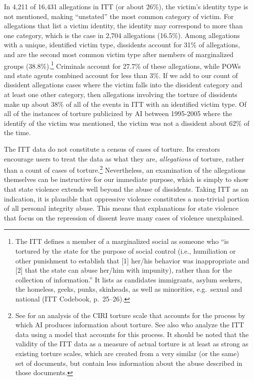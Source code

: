 \documentclass[12pt]{article}
\begin{document}
In 4,211 of 16,431 allegations in ITT (or about 26\%), the victim's identity type is not mentioned, making ``unstated'' the most common category of victim. For allegations that list a victim identity, the identity may correspond to more than one category, which is the case in 2,704 allegations (16.5\%). Among allegations with a unique, identified victim type, dissidents account for 31\% of allegations, and are the second most common victim type after members of marginalized groups (38.8\%).\footnote{The ITT defines a member of a marginalized social as someone who ``is tortured by the state for the purpose of social control (i.e., humiliation or other punishment to establish that [1] her/his behavior was inappropriate and [2] that the state can abuse her/him with impunity), rather than for the collection of information.'' It lists as candidates immigrants, asylum seekers, the homeless, geeks, punks, skinheads, as well as minorities, e.g.\ sexual and national (ITT Codebook, p.\ 25--26).} Criminals account for 27.7\% of these allegations, while POWs and state agents combined account for less than 3\%. If we add to our count of dissident allegations cases where the victim falls into the dissident category and at least one other category, then allegations involving the torture of dissidents make up about 38\% of all of the events in ITT with an identified victim type. Of all of the instances of torture publicized by AI between 1995-2005 where the identify of the victim was mentioned, the victim was not a dissident about 62\% of the time. 

The ITT data do not constitute a census of cases of torture. Its creators encourage users to treat the data as what they are, {\em allegations} of torture, rather than a count of cases of torture.\footnote{See \citet{HillMooreMukherjee2013} for an analysis of the CIRI torture scale that accounts for the process by which AI produces information about torture. See also \citet{ConradHillMoore} who analyze the ITT data using a model that accounts for this process. It should be noted that the validity of the ITT data as a measure of actual torture is at least as strong as existing torture scales, which are created from a very similar (or the same) set of documents, but contain less information about the abuse described in those documents.} Nevertheless, an examination of the allegations themselves can be instructive for our immediate purpose, which is simply to show that state violence extends well beyond the abuse of dissidents. Taking ITT as an indication, it is plausible that oppressive violence constitutes a non-trivial portion of all personal integrity abuse. This means that explanations for state violence that focus on the repression of dissent leave many cases of violence unexplained. 
\end{document}
